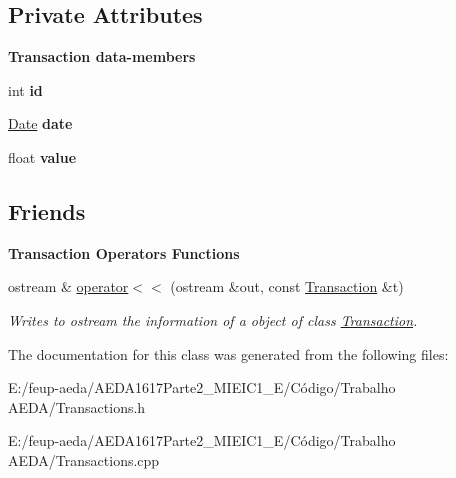 \subsection*{Private Attributes}
\begin{Indent}\textbf{ Transaction data-\/members}\par
\begin{DoxyCompactItemize}
\item 
int {\bfseries id}
\item 
\hyperlink{class_date}{Date} {\bfseries date}
\item 
float {\bfseries value}
\end{DoxyCompactItemize}
\end{Indent}
\subsection*{Friends}
\begin{Indent}\textbf{ Transaction Operators Functions}\par
\begin{DoxyCompactItemize}
\item 
ostream \& \hyperlink{group___transaction_ga75af23fbc3b593013d411cf50c5a3a7a}{operator$<$$<$} (ostream \&out, const \hyperlink{class_transaction}{Transaction} \&t)
\begin{DoxyCompactList}\small\item\em Writes to ostream the information of a object of class \hyperlink{class_transaction}{Transaction}. \end{DoxyCompactList}\end{DoxyCompactItemize}
\end{Indent}


The documentation for this class was generated from the following files\+:\begin{DoxyCompactItemize}
\item 
E\+:/feup-\/aeda/\+A\+E\+D\+A1617\+Parte2\+\_\+M\+I\+E\+I\+C1\+\_\+\+E/\+Código/\+Trabalho A\+E\+D\+A/Transactions.\+h\item 
E\+:/feup-\/aeda/\+A\+E\+D\+A1617\+Parte2\+\_\+M\+I\+E\+I\+C1\+\_\+\+E/\+Código/\+Trabalho A\+E\+D\+A/Transactions.\+cpp\end{DoxyCompactItemize}
